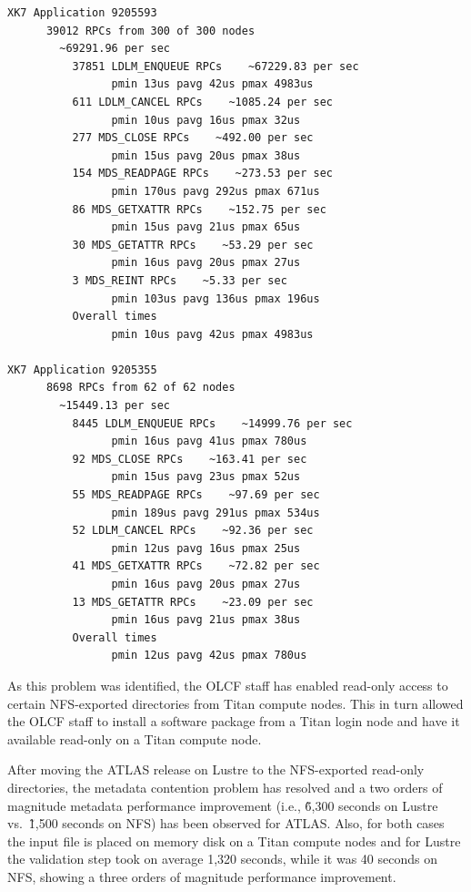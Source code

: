 \begin{minipage}{\linewidth}
\begin{lstlisting}[language=bash,frame=single,basicstyle=\ttfamily\tiny,caption=ATLAS metadata trace,label=mdstrace]
XK7 Application 9205593
      39012 RPCs from 300 of 300 nodes
        ~69291.96 per sec
          37851 LDLM_ENQUEUE RPCs    ~67229.83 per sec
                pmin 13us pavg 42us pmax 4983us
          611 LDLM_CANCEL RPCs    ~1085.24 per sec
                pmin 10us pavg 16us pmax 32us
          277 MDS_CLOSE RPCs    ~492.00 per sec
                pmin 15us pavg 20us pmax 38us
          154 MDS_READPAGE RPCs    ~273.53 per sec
                pmin 170us pavg 292us pmax 671us
          86 MDS_GETXATTR RPCs    ~152.75 per sec
                pmin 15us pavg 21us pmax 65us
          30 MDS_GETATTR RPCs    ~53.29 per sec
                pmin 16us pavg 20us pmax 27us
          3 MDS_REINT RPCs    ~5.33 per sec
                pmin 103us pavg 136us pmax 196us
          Overall times
                pmin 10us pavg 42us pmax 4983us

XK7 Application 9205355
      8698 RPCs from 62 of 62 nodes
        ~15449.13 per sec
          8445 LDLM_ENQUEUE RPCs    ~14999.76 per sec
                pmin 16us pavg 41us pmax 780us
          92 MDS_CLOSE RPCs    ~163.41 per sec
                pmin 15us pavg 23us pmax 52us
          55 MDS_READPAGE RPCs    ~97.69 per sec
                pmin 189us pavg 291us pmax 534us
          52 LDLM_CANCEL RPCs    ~92.36 per sec
                pmin 12us pavg 16us pmax 25us
          41 MDS_GETXATTR RPCs    ~72.82 per sec
                pmin 16us pavg 20us pmax 27us
          13 MDS_GETATTR RPCs    ~23.09 per sec
                pmin 16us pavg 21us pmax 38us
          Overall times
                pmin 12us pavg 42us pmax 780us

\end{lstlisting}
\end{minipage}

As this problem was identified, the OLCF staff has enabled read-only access to
certain NFS-exported directories from Titan compute nodes. This in turn allowed
the OLCF staff to install a software package from a Titan login node and have
it available read-only on a Titan compute node.

After moving the ATLAS release on Lustre to the NFS-exported read-only
directories, the metadata contention problem has resolved and a two orders of
magnitude metadata performance improvement (i.e., \~6,300 seconds on Lustre vs.\
\~1,500 seconds on NFS) has been observed for ATLAS\@.  Also, for both cases the
input file is placed on memory disk on a Titan compute nodes and for Lustre the
validation step took on average 1,320 seconds, while it was 40 seconds on NFS,
showing a three orders of magnitude performance improvement.

